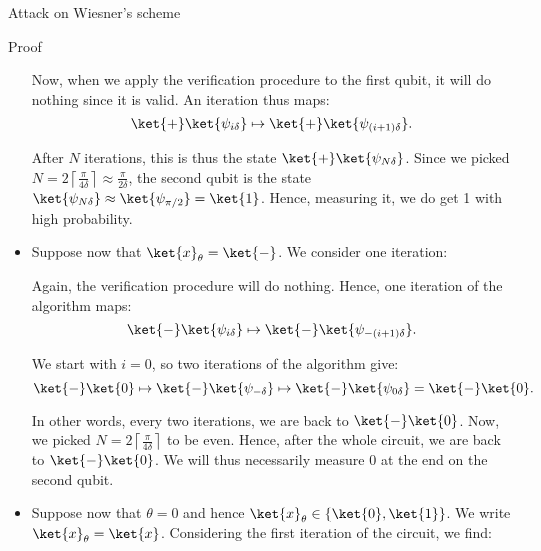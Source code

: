 \documentclass[a4paper]{article}
\begin{document}
\begin{parag}{Attack on Wiesner's scheme}
\begin{subparag}{Proof}
\begin{itemize}[left=0pt]
                Now, when we apply the verification procedure to the first qubit, it will do nothing since it is valid. An iteration thus maps: 
                \[\ket{+} \ket{\psi_{i \delta}} \mapsto \ket{+} \ket{\psi_{\left(i+1\right) \delta}}.\]
                
                After $N$ iterations, this is thus the state $\ket{+} \ket{\psi_{N \delta}}$. Since we picked $N = 2 \left\lceil \frac{\pi}{4 \delta} \right\rceil \approx \frac{\pi}{2 \delta}$, the second qubit is the state $\ket{\psi_{N \delta}} \approx \ket{\psi_{\pi/2}} = \ket{1}$. Hence, measuring it, we do get 1 with high probability. 
                \item Suppose now that $\ket{x}_{\theta} = \ket{-}$. We consider one iteration:

                Again, the verification procedure will do nothing. Hence, one iteration of the algorithm maps: 
                \[\ket{-}\ket{\psi_{i \delta}} \mapsto \ket{-} \ket{\psi_{-\left(i+1\right) \delta}}.\]
                
                We start with $i = 0$, so two iterations of the algorithm give: 
                \[\ket{-}\ket{0} \mapsto \ket{-} \ket{\psi_{- \delta}} \mapsto \ket{-} \ket{\psi_{0 \delta}} = \ket{-} \ket{0}.\]
                
                In other words, every two iterations, we are back to $\ket{-}\ket{0}$. Now, we picked $N = 2 \left\lceil \frac{\pi}{4 \delta} \right\rceil $ to be even. Hence, after the whole circuit, we are back to $\ket{-}\ket{0}$. We will thus necessarily measure $0$ at the end on the second qubit. 
             
            \item Suppose now that $\theta = 0$ and hence $\ket{x}_{\theta} \in \left\{\ket{0}, \ket{1}\right\}$. We write $\ket{x}_{\theta} = \ket{x}$. Considering the first iteration of the circuit, we find:


\end{itemize}
\end{subparag}
\end{parag}
\end{document}
